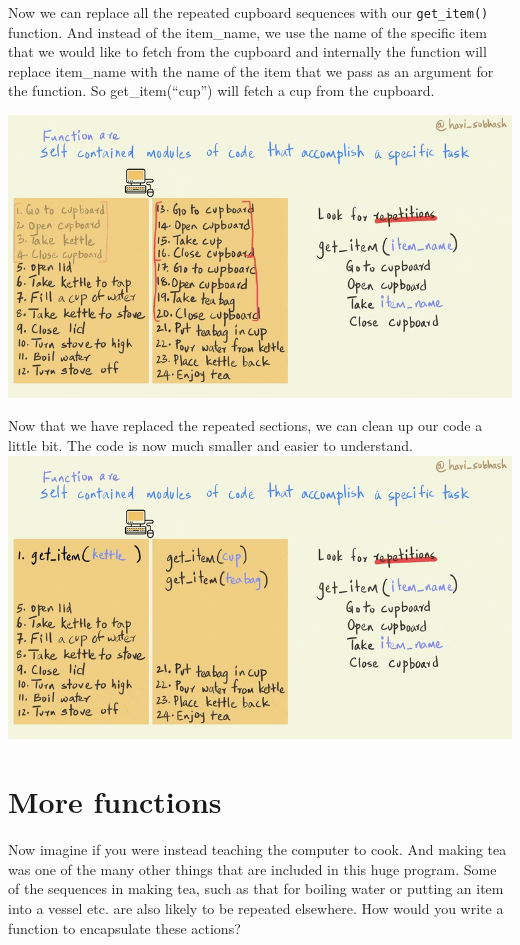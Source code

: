 \documentclass[
]{book}
\begin{document}
Now we can replace all the repeated cupboard sequences with our \texttt{get\_item()} function. And instead of the item\_name, we use the name of the specific item that we would like to fetch from the cupboard and internally the function will replace item\_name with the name of the item that we pass as an argument for the function. So get\_item(``cup'') will fetch a cup from the cupboard.

\includegraphics{assets/ch_3-functions/gifs/replace.gif}

Now that we have replaced the repeated sections, we can clean up our code a little bit. The code is now much smaller and easier to understand.
\includegraphics{assets/ch_3-functions/gifs/clean_code.gif}

\hypertarget{more-functions}{%
\section{More functions}\label{more-functions}}

Now imagine if you were instead teaching the computer to cook. And making tea was one of the many other things that are included in this huge program. Some of the sequences in making tea, such as that for boiling water or putting an item into a vessel etc. are also likely to be repeated elsewhere. How would you write a function to encapsulate these actions?
\end{document}
